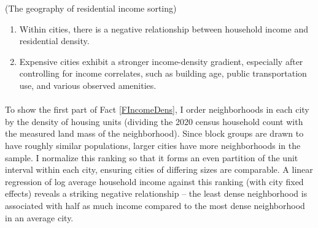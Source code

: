 \documentclass[12pt]{article}
\begin{document}
	\begin{Fact}\label{FIncomeDens}
		(The geography of residential income sorting)
		\begin{enumerate}
			\item Within cities, there is a negative relationship between household income and residential density. 
		
			\item Expensive cities exhibit a stronger income-density gradient, especially after controlling for income correlates, such as building age, public transportation use, and various observed amenities.
		\end{enumerate}
	\end{Fact}

	\paragraph*{}
	To show the first part of Fact \ref{FIncomeDens}, I order neighborhoods in each city by the density of housing units (dividing the 2020 census household count with the measured land mass of the neighborhood). Since block groups are drawn to have roughly similar populations, larger cities have more neighborhoods in the sample. I normalize this ranking so that it forms an even partition of the unit interval within each city, ensuring cities of differing sizes are comparable. A linear regression of log average household income against this ranking (with city fixed effects) reveals a striking negative relationship -- the least dense neighborhood is associated with half as much income compared to the most dense neighborhood in an average city. 
\end{document}
